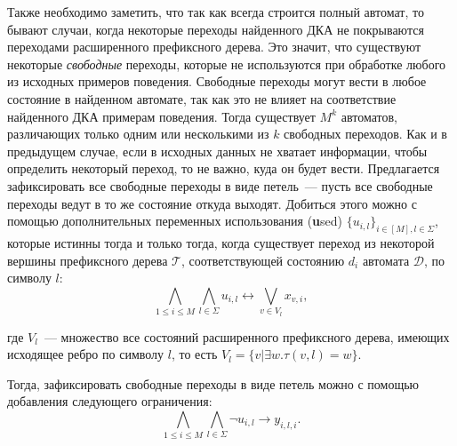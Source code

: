 Также необходимо заметить, что так как всегда строится полный автомат, то бывают случаи, когда некоторые переходы найденного ДКА не покрываются переходами расширенного префиксного дерева.
Это значит, что существуют некоторые \emph{свободные} переходы, которые не используются при обработке любого из исходных примеров поведения.
Свободные переходы могут вести в любое состояние в найденном автомате, так как это не влияет на соответствие найденного ДКА примерам поведения.
Тогда существует $M^{k}$ автоматов, различающих только одним или несколькими из $k$ свободных переходов.
Как и в предыдущем случае, если в исходных данных не хватает информации, чтобы определить некоторый переход, то не важно, куда он будет вести.
Предлагается зафиксировать все свободные переходы в виде петель~{---} пусть все свободные переходы ведут в то же состояние откуда выходят.
Добиться этого можно с помощью дополнительных переменных использования (\textbf{u}sed) $\{u_{i,l}\}_{i \in \left[M\right],l \in \Sigma}$, которые истинны тогда и только тогда, когда существует переход из некоторой вершины префиксного дерева $\mathcal{T}$, соответствующей состоянию $d_{i}$ автомата $\mathcal{D}$, по символу $l$:
\begin{equation*}
\bigwedge_{1 \leq i \leq M} \bigwedge_{l \in \Sigma} u_{i,l} \leftrightarrow \bigvee_{v \in V_{l}}x_{v,i},
\end{equation*}

где $V_{l}$~{---} множество все состояний расширенного префиксного дерева, имеющих исходящее ребро по символу $l$, то есть $V_{l} = \{v | \exists w.\tau\left(v,l\right) = w\}$.

Тогда, зафиксировать свободные переходы в виде петель можно с помощью добавления следующего ограничения:
\begin{equation*}
\bigwedge_{1 \leq i \leq M} \bigwedge_{l \in \Sigma} \neg u_{i,l} \rightarrow y_{i,l,i}.
\end{equation*}

